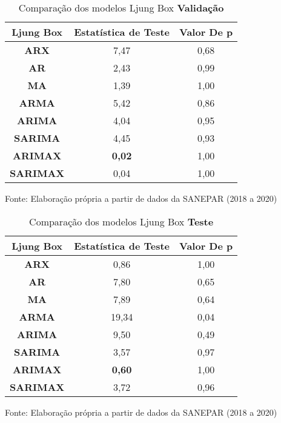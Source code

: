 \begin{table}[H]
	\centering
	\caption{Comparação dos modelos Ljung Box \textbf{Validação} }\label{tb:lbvld}
	\begin{tabular}{@{}ccc@{}}
		\toprule
		\textbf{Ljung Box} & \textbf{Estatística de Teste} & \textbf{Valor De p} \\ \midrule
\textbf{ARX}       & 7,47                          & 0,68                \\
\textbf{AR}        & 2,43                          & 0,99                \\
\textbf{MA}        & 1,39                          & 1,00                \\
\textbf{ARMA}      & 5,42                          & 0,86                \\
\textbf{ARIMA}     & 4,04                          & 0,95                \\
\textbf{SARIMA}    & 4,45                          & 0,93                \\
\textbf{ARIMAX}    & \textbf{0,02}                          & 1,00                \\
\textbf{SARIMAX}   & 0,04                          & 1,00                \\ \bottomrule
	\end{tabular}

Fonte: Elaboração própria a partir de dados da SANEPAR (2018 a 2020)
\end{table}

\begin{table}[H]
	\centering
	\caption{Comparação dos modelos Ljung Box \textbf{Teste} }\label{tb:lbtst}
	\begin{tabular}{@{}ccc@{}}
		\toprule
		\textbf{Ljung Box} & \textbf{Estatística de Teste} & \textbf{Valor De p} \\ \midrule
\textbf{ARX}       & 0,86                          & 1,00                \\
\textbf{AR}        & 7,80                          & 0,65                \\
\textbf{MA}        & 7,89                          & 0,64                \\
\textbf{ARMA}      & 19,34                         & 0,04                \\
\textbf{ARIMA}     & 9,50                          & 0,49                \\
\textbf{SARIMA}    & 3,57                          & 0,97                \\
\textbf{ARIMAX}    & \textbf{0,60}                          & 1,00                \\
\textbf{SARIMAX}   & 3,72                          & 0,96                \\ \bottomrule
	\end{tabular}
	
	Fonte: Elaboração própria a partir de dados da SANEPAR (2018 a 2020)
\end{table}

